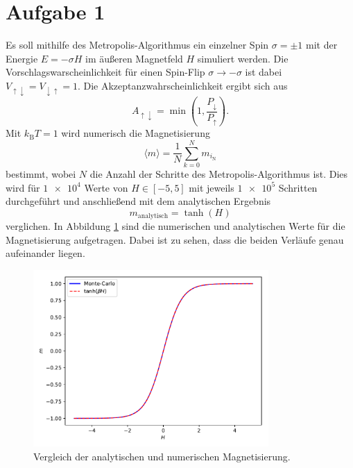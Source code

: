\section*{Aufgabe 1}

Es soll mithilfe des Metropolis-Algorithmus ein einzelner Spin \(\sigma = \pm 1\) mit der Energie \(E = -\sigma H\) im äußeren Magnetfeld \(H\) simuliert werden.
Die Vorschlagswarscheinlichkeit für einen Spin-Flip \(\sigma \rightarrow -\sigma\) ist dabei \(V_{\uparrow \downarrow} = V_{\downarrow \uparrow} = 1\). Die Akzeptanzwahrscheinlichkeit ergibt sich aus
\begin{equation*}
  A_{\uparrow \downarrow} = \min{\left(1, \frac{P_\downarrow}{P_\uparrow} \right)}.
\end{equation*}
Mit \(k_\text{B}T = 1\) wird numerisch die Magnetisierung
\begin{equation*}
  \langle m \rangle = \frac{1}{N} \sum_{k=0}^N m_{i_\text{N}}
\end{equation*}
bestimmt, wobei \(N\) die Anzahl der Schritte des Metropolis-Algorithmus ist.
Dies wird für \(\num{1e4}\) Werte von \(H \in [-5,5]\) mit jeweils \(\num{1e5}\) Schritten durchgeführt und anschließend mit dem analytischen Ergebnis
\begin{equation*}
  m_\text{analytisch} = \tanh{\!(H)}
\end{equation*}
verglichen.
In Abbildung \ref{fig:vergleich} sind die numerischen und analytischen Werte für die Magnetisierung aufgetragen. Dabei ist zu sehen, dass die beiden Verläufe genau aufeinander liegen.
\begin{figure}
  \includegraphics[width=0.8\textwidth]{A1/build/vergleich.pdf}
  \caption{Vergleich der analytischen und numerischen Magnetisierung.}
  \label{fig:vergleich}
\end{figure}
